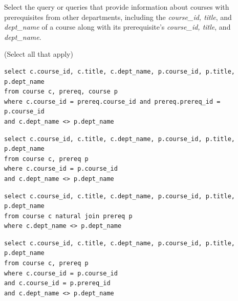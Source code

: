 \documentclass[12pt, addpoints, answers]{exam}
\begin{document}
\begin{questions}
\begin{minipage}{\linewidth}
\question[8]
Select the query or queries that provide information about courses with prerequisites from other departments, 
including the \textit{course\_id, title}, and \textit{dept\_name} of a course along with its prerequisite's \textit{course\_id, title}, 
and \textit{dept\_name}.\par\vspace{0.5em}
(Select all that apply)\par\vspace{0.5em}
\begin{checkboxes} 
    \CorrectChoice \begin{verbatim}
select c.course_id, c.title, c.dept_name, p.course_id, p.title, p.dept_name
from course c, prereq, course p
where c.course_id = prereq.course_id and prereq.prereq_id = p.course_id
and c.dept_name <> p.dept_name
    \end{verbatim}
    \choice \begin{verbatim}
select c.course_id, c.title, c.dept_name, p.course_id, p.title, p.dept_name
from course c, prereq p
where c.course_id = p.course_id
and c.dept_name <> p.dept_name
    \end{verbatim}
    \choice \begin{verbatim}
select c.course_id, c.title, c.dept_name, p.course_id, p.title, p.dept_name
from course c natural join prereq p
where c.dept_name <> p.dept_name
    \end{verbatim}
    \choice \begin{verbatim}
select c.course_id, c.title, c.dept_name, p.course_id, p.title, p.dept_name
from course c, prereq p
where c.course_id = p.course_id
and c.course_id = p.prereq_id
and c.dept_name <> p.dept_name
    \end{verbatim}
\end{checkboxes}
\end{minipage}\vspace{1em}


\end{questions}
\end{document}
